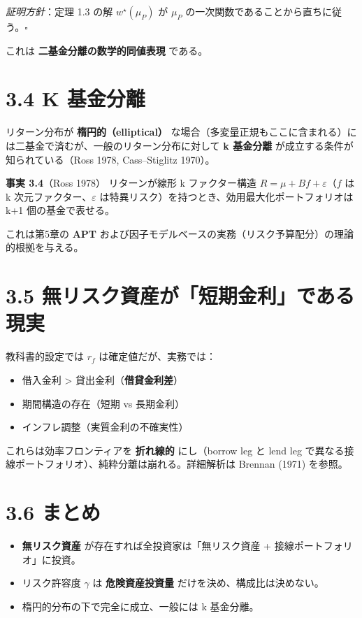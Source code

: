 \documentclass[11pt,a4paper]{report}
\begin{document}
\emph{証明方針}：定理 1.3 の解 $w^\star(\mu_P)$ が $\mu_P$ の一次関数であることから直ちに従う。$\square$

これは \textbf{二基金分離の数学的同値表現} である。

\section{3.4 K 基金分離}

リターン分布が \textbf{楕円的（elliptical）} な場合（多変量正規もここに含まれる）には二基金で済むが、一般のリターン分布に対して \textbf{k 基金分離} が成立する条件が知られている（Ross 1978, Cass–Stiglitz 1970）。

\textbf{事実 3.4}（Ross 1978） リターンが線形 k ファクター構造 $R = \mu + B f + \varepsilon$（$f$ は k 次元ファクター、$\varepsilon$ は特異リスク）を持つとき、効用最大化ポートフォリオは k+1 個の基金で表せる。

これは第5章の \textbf{APT} および因子モデルベースの実務（リスク予算配分）の理論的根拠を与える。

\section{3.5 無リスク資産が「短期金利」である現実}

教科書的設定では $r_f$ は確定値だが、実務では：

\begin{itemize}
\item 借入金利 > 貸出金利（\textbf{借貸金利差}）
\item 期間構造の存在（短期 vs 長期金利）
\item インフレ調整（実質金利の不確実性）
\end{itemize}

これらは効率フロンティアを \textbf{折れ線的} にし（borrow leg と lend leg で異なる接線ポートフォリオ）、純粋分離は崩れる。詳細解析は Brennan (1971) を参照。

\section{3.6 まとめ}

\begin{itemize}
\item \textbf{無リスク資産} が存在すれば全投資家は「無リスク資産 + 接線ポートフォリオ」に投資。
\item リスク許容度 $\gamma$ は \textbf{危険資産投資量} だけを決め、構成比は決めない。
\item 楕円的分布の下で完全に成立、一般には k 基金分離。
\end{itemize}
\end{document}
